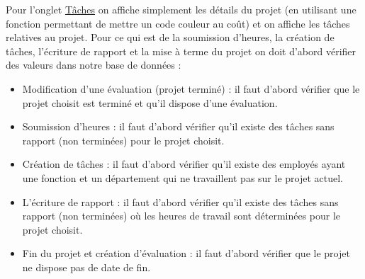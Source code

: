 Pour l'onglet \href{http://ms8db.montefiore.ulg.ac.be/s191230/add.php}{Tâches} on affiche simplement les détails du projet (en utilisant une fonction permettant de mettre un code couleur au coût) et on affiche les tâches relatives au projet. Pour ce qui est de la soumission d'heures, la création de tâches, l'écriture de rapport et la mise à terme du projet on doit d'abord vérifier des valeurs dans notre base de données :
\begin{itemize}
  \item Modification d'une évaluation (projet terminé) : il faut d'abord vérifier que le projet choisit est terminé et qu'il dispose d'une évaluation.
  \item Soumission d'heures : il faut d'abord vérifier qu'il existe des tâches sans rapport (non terminées) pour le projet choisit.
  \item Création de tâches : il faut d'abord vérifier qu'il existe des employés ayant une fonction et un département qui ne travaillent pas sur le projet actuel.
  \item L'écriture de rapport : il faut d'abord vérifier qu'il existe des tâches sans rapport (non terminées) où les heures de travail sont déterminées pour le projet choisit.
  \item Fin du projet et création d'évaluation : il faut d'abord vérifier que le projet ne dispose pas de date de fin.
\end{itemize}

